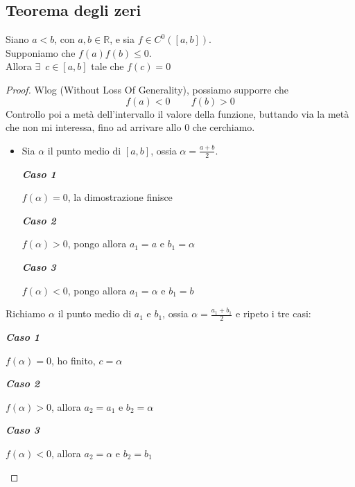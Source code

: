 \documentclass{article}
\theoremstyle{definition}
\begin{document}
\subsection{Teorema degli zeri}
Siano $a<b$, con $a,b \in \mathbb{R}$, e sia $f \in C^0([a,b])$.
\\
Supponiamo che $f(a)f(b) \leqslant0$.
\\
Allora $\exists \,\,\, c \in [a,b]$ tale che $f(c)=0$
\begin{proof}
    Wlog (Without Loss Of Generality), possiamo supporre che
    \begin{equation}
        f(a)<0 \,\,\,\,\,\,\,\,\,\,\,\,\, f(b)>0
    \end{equation}
    Controllo poi a metà dell'intervallo il valore della funzione, buttando via la metà che non mi interessa, fino ad arrivare allo 0 che cerchiamo.
    \begin{itemize}
        \item Sia $\alpha$ il punto medio di $[a,b]$, ossia $\alpha=\frac{a+b}{2}$.
        \begin{center}
            \textbf{\textit{Caso 1}}
        \end{center}
        $f(\alpha)=0$, la dimostrazione finisce
        \begin{center}
            \textbf{\textit{Caso 2}}
        \end{center}
        $f(\alpha)>0$, pongo allora $a_1=a$ e $b_1=\alpha$
        \begin{center}
            \textbf{\textit{Caso 3}}
        \end{center}
        $f(\alpha)<0$, pongo allora $a_1=\alpha$ e $b_1=b$
    \end{itemize}
   Richiamo $\alpha$ il punto medio di $a_1$ e $b_1$, ossia $\alpha = \frac{a_1+b_1}{2}$ e ripeto i tre casi:
\begin{center}
    \textbf{\textit{Caso 1}}
\end{center}
$f(\alpha)=0$, ho finito, $c=\alpha$
\begin{center}
    \textbf{\textit{Caso 2}}
\end{center}
$f(\alpha)>0$, allora $a_{2}=a_1$ e $b_{2}=\alpha$
\begin{center}
\begin{center}
    \textbf{\textit{Caso 3}}
\end{center}
\begin{center}
    $f(\alpha)<0$, allora $a_{2}=\alpha$ e $b_{2}=b_1$
    \end{center}
\end{center}

\end{proof}
\end{document}
